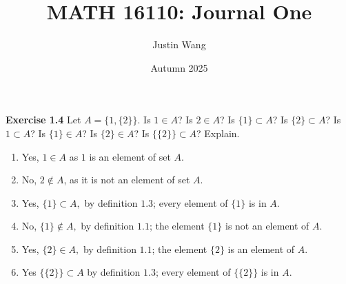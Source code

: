 \documentclass[11pt]{article}
\title{MATH 16110: Journal One}
\author{Justin Wang}
\date{Autumn 2025}
\begin{document}
\maketitle 
\noindent\textbf{Exercise 1.4}
Let $A=\{1, \{2\}\}$.  Is $1\in A$?  Is $2\in A$?  Is $\{1\}\subset A$?  Is $\{2\}\subset A$?  
Is $1\subset A$?  Is $\{1\}\in A$?  Is $\{2\}\in A$?  Is $\{\{2\}\}\subset A$?  
Explain.
\begin{enumerate}
    \item Yes, $1 \in A$ as $1$ is an element of set $A$.
    \item No, $2 \notin A$, as it is not an element of set $A$.
    \item Yes, $\{1\} \subset A,$ by definition $1.3$; every element of $\{1\} $ is in $A$.
    \item No, $\{1\} \notin A,$ by definition $1.1$; the element $\{1\}$ is not an element of $A$.
    \item Yes, $\{2\} \in A,$ by definition $1.1$; the element $\{2\}$ is an element of $A$.
    \item Yes $\{\{2\}\} \subset A$ by definition $1.3$; every element of $\{\{2\}\}$ is in $A$.
\end{enumerate}
\end{document}
